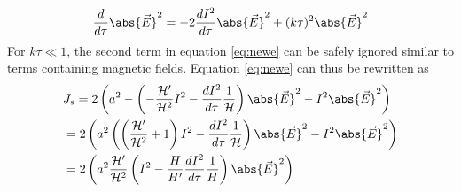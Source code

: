 \begin{equation}
    \dfrac{d}{d\tau}\abs{\vec{E}}^2 =  -2\dfrac{d I^2}{d\tau} \abs{\vec{E}}^2 + (k\tau)^2 \abs{\vec{E}}^2
    \label{eq:newe}
\end{equation}
For $k\tau\ll1$, the second term in equation \eqref{eq:newe} can be safely ignored similar to terms containing  magnetic fields. Equation \eqref{eq:newe} can thus be rewritten as
\begin{equation}
    \begin{split}
        & J_s= 2\left( a^2 -\left( -\frac{\mathcal{H}'}{\mathcal{H}^2}I^2-\dfrac{d I^2}{d\tau} \frac{1}{\mathcal{H}} \right) \abs{\vec{E}}^2  -   I^2 \abs{\vec{E}}^2\right)  \\
        &=  2 \left( a^2 \left( \left(\frac{\mathcal{H}'}{\mathcal{H}^2}+1 \right) I^2-\dfrac{d I^2}{d\tau} \frac{1}{\mathcal{H}} \right) \abs{\vec{E}}^2  -   I^2 \abs{\vec{E}}^2\right)\\
        &= 2 \left( a^2 \frac{\mathcal{H}'}{\mathcal{H}^2} \left(  I^2-\frac{H}{H'}\dfrac{d I^2}{d\tau} \frac{1}{H} \right) \abs{\vec{E}}^2  \right)
    \end{split}
\end{equation}